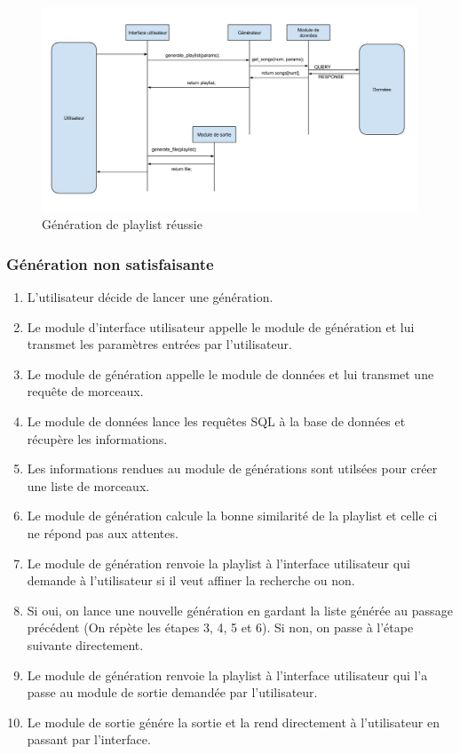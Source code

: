 \documentclass[11pt,a4paper]{article}
\begin{document}
\begin{figure}[!h]
\includegraphics[width=14cm]{generation_fonctionnel.png}
\caption{Génération de playlist réussie}
\end{figure}

\subsubsection{Génération non satisfaisante}

\begin{enumerate}
\item L'utilisateur décide de lancer une génération.
\item Le module d'interface utilisateur appelle le module de génération et lui
transmet les paramètres entrées par l'utilisateur.
\item Le module de génération appelle le module de données et lui transmet une
requête de morceaux.
\item Le module de données lance les requêtes SQL à la base de données et
récupère les informations.
\item Les informations rendues au module de générations sont utilsées pour créer
une liste de morceaux.
\item Le module de génération calcule la bonne similarité de la playlist et
celle ci ne répond pas aux attentes.
\item Le module de génération renvoie la playlist  à l'interface utilisateur qui
demande à l'utilisateur si il veut affiner la recherche ou non.
\item Si oui, on lance une nouvelle génération en gardant la liste générée au
passage précédent (On répète les étapes 3, 4, 5 et 6). Si non, on passe à
l'étape suivante directement.
\item Le module de génération renvoie la playlist à l'interface utilisateur qui
l'a passe au module de sortie demandée par l'utilisateur.
\item Le module de sortie génére la sortie et la rend directement à
l'utilisateur en passant par l'interface.
\end{enumerate}
\end{document}
